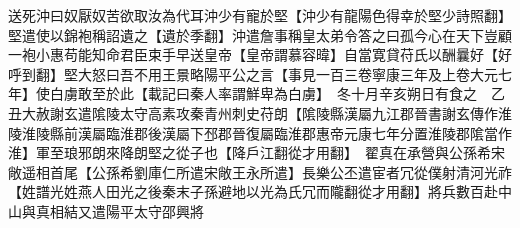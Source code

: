 送死沖曰奴厭奴苦欲取汝為代耳沖少有寵於堅【沖少有龍陽色得幸於堅少詩照翻】堅遣使以錦袍稱詔遺之【遺於季翻】沖遣詹事稱皇太弟令答之曰孤今心在天下豈顧一袍小惠苟能知命君臣束手早送皇帝【皇帝謂慕容暐】自當寛貸苻氏以酬曩好【好呼到翻】堅大怒曰吾不用王㬌略陽平公之言【事見一百三卷寧康三年及上卷大元七年】使白虜敢至於此【載記曰秦人率謂鮮卑為白虜】　冬十月辛亥朔日有食之　乙丑大赦謝玄遣隂陵太守高素攻秦青州刺史苻朗【隂陵縣漢屬九江郡晉書謝玄傳作淮陵淮陵縣前漢屬臨淮郡後漢屬下邳郡晉復屬臨淮郡惠帝元康七年分置淮陵郡隂當作淮】軍至琅邪朗來降朗堅之從子也【降戶江翻從才用翻】　翟真在承營與公孫希宋敞遥相首尾【公孫希劉庫仁所遣宋敞王永所遣】長樂公丕遣宦者冗從僕射清河光祚【姓譜光姓燕人田光之後秦末子孫避地以光為氏冗而隴翻從才用翻】將兵數百赴中山與真相結又遣陽平太守邵興將